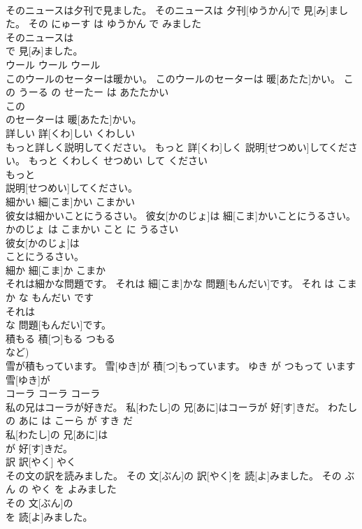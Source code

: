 \documentclass[8pt]{extreport}
\begin{document}
\begin{CJK}{UTF8}{min}
\\	そのニュースは夕刊で見ました。	そのニュースは 夕刊[ゆうかん]で 見[み]ました。	その にゅーす は ゆうかん で みました	
\\	そのニュースは
\\	で 見[み]ました。		
\\	ウール	ウール	ウール	
\\	このウールのセーターは暖かい。	このウールのセーターは 暖[あたた]かい。	この うーる の せーたー は あたたかい	
\\	この
\\	のセーターは 暖[あたた]かい。		
\\	詳しい	詳[くわ]しい	くわしい	
\\	もっと詳しく説明してください。	もっと 詳[くわ]しく 説明[せつめい]してください。	もっと くわしく せつめい して ください	
\\	もっと
\\	説明[せつめい]してください。		
\\	細かい	細[こま]かい	こまかい	
\\	彼女は細かいことにうるさい。	彼女[かのじょ]は 細[こま]かいことにうるさい。	かのじょ は こまかい こと に うるさい	
\\	彼女[かのじょ]は
\\	ことにうるさい。		
\\	細か	細[こま]か	こまか	
\\	それは細かな問題です。	それは 細[こま]かな 問題[もんだい]です。	それ は こまか な もんだい です	
\\	それは
\\	な 問題[もんだい]です。		
\\	積もる	積[つ]もる	つもる	
\\	など)		
\\	雪が積もっています。	雪[ゆき]が 積[つ]もっています。	ゆき が つもって います	
\\	雪[ゆき]が
\\	コーラ	コーラ	コーラ	
\\	私の兄はコーラが好きだ。	私[わたし]の 兄[あに]はコーラが 好[す]きだ。	わたし の あに は こーら が すき だ	
\\	私[わたし]の 兄[あに]は
\\	が 好[す]きだ。		
\\	訳	訳[やく]	やく	
\\	その文の訳を読みました。	その 文[ぶん]の 訳[やく]を 読[よ]みました。	その ぶん の やく を よみました	
\\	その 文[ぶん]の
\\	を 読[よ]みました。		

\end{CJK}
\end{document}
